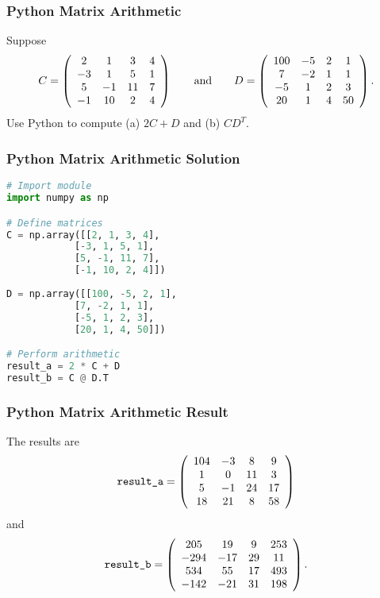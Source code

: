 \documentclass{beamer}
\begin{document}
\begin{frame}[t]
\frametitle{Python Matrix Arithmetic}
\begin{Example}
Suppose
$$
C = \left(\begin{array}{c c c c} 2		& 	1	&	3	&	4\\	-3	&	1	&	5	&	1\\	5	&	-1	&	11	&	7\\	-1	&	10	&	2	&4 \end{array}\right)
\qquad\text{and}\qquad
D =  \left(\begin{array}{c c c c} 100	& 	-5	&	2	&	1\\	7	&	-2	&	1	&	1\\	-5	&	1	&	2	&	3\\	20	&	1	&	4	&	50 \end{array}\right).
$$
Use Python to compute (a) $2C + D$ and (b) $C D^T$.
\end{Example}

\end{frame}

\begin{frame}[fragile]
\frametitle{Python Matrix Arithmetic Solution}
\begin{lstlisting}[language=Python]
# Import module
import numpy as np

# Define matrices
C = np.array([[2, 1, 3, 4], 
			[-3, 1, 5, 1], 
			[5, -1, 11, 7], 
			[-1, 10, 2, 4]])
			
D = np.array([[100, -5, 2, 1], 
			[7, -2, 1, 1], 
			[-5, 1, 2, 3], 
			[20, 1, 4, 50]])

# Perform arithmetic 
result_a = 2 * C + D
result_b = C @ D.T
\end{lstlisting}
\end{frame}

\begin{frame}
\frametitle{Python Matrix Arithmetic Result}
The results are
$$
\texttt{result\_a}  = \left(\begin{array}{c c c c} 104	&	-3	&	8	&	9\\	1	&	0	&	11	&	3\\ 5	&	-1	&	24	&	17\\	18	&	21	&	8	&	58 \end{array}\right)
$$
and
$$
\texttt{result\_b}	= \left(\begin{array}{c c c c} 205	&	19	&	9	&	253\\	-294	&	-17	&	29	&	11\\ 534	&	55	&	17	&	493\\	-142	&	-21	&	31	&	198 \end{array}\right).
$$

\end{frame}
\end{document}

